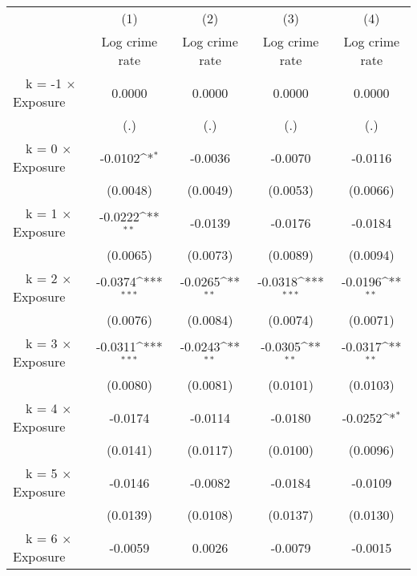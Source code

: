 {
\def\sym#1{\ifmmode^{#1}\else\(^{#1}\)\fi}
\begin{tabular}{l*{4}{c}}
\toprule
                &\multicolumn{1}{c}{(1)}&\multicolumn{1}{c}{(2)}&\multicolumn{1}{c}{(3)}&\multicolumn{1}{c}{(4)}\\
                &\multicolumn{1}{c}{Log crime rate}&\multicolumn{1}{c}{Log crime rate}&\multicolumn{1}{c}{Log crime rate}&\multicolumn{1}{c}{Log crime rate}\\
\midrule
~~k = -1 $\times$ Exposure&   0.0000         &   0.0000         &   0.0000         &   0.0000         \\
                &      (.)         &      (.)         &      (.)         &      (.)         \\
\addlinespace
~~k = 0 $\times$ Exposure&  -0.0102\sym{*}  &  -0.0036         &  -0.0070         &  -0.0116         \\
                & (0.0048)         & (0.0049)         & (0.0053)         & (0.0066)         \\
\addlinespace
~~k = 1 $\times$ Exposure&  -0.0222\sym{**} &  -0.0139         &  -0.0176         &  -0.0184         \\
                & (0.0065)         & (0.0073)         & (0.0089)         & (0.0094)         \\
\addlinespace
~~k = 2 $\times$ Exposure&  -0.0374\sym{***}&  -0.0265\sym{**} &  -0.0318\sym{***}&  -0.0196\sym{**} \\
                & (0.0076)         & (0.0084)         & (0.0074)         & (0.0071)         \\
\addlinespace
~~k = 3 $\times$ Exposure&  -0.0311\sym{***}&  -0.0243\sym{**} &  -0.0305\sym{**} &  -0.0317\sym{**} \\
                & (0.0080)         & (0.0081)         & (0.0101)         & (0.0103)         \\
\addlinespace
~~k = 4 $\times$ Exposure&  -0.0174         &  -0.0114         &  -0.0180         &  -0.0252\sym{*}  \\
                & (0.0141)         & (0.0117)         & (0.0100)         & (0.0096)         \\
\addlinespace
~~k = 5 $\times$ Exposure&  -0.0146         &  -0.0082         &  -0.0184         &  -0.0109         \\
                & (0.0139)         & (0.0108)         & (0.0137)         & (0.0130)         \\
\addlinespace
~~k = 6 $\times$ Exposure&  -0.0059         &   0.0026         &  -0.0079         &  -0.0015         \\

\end{tabular}}
